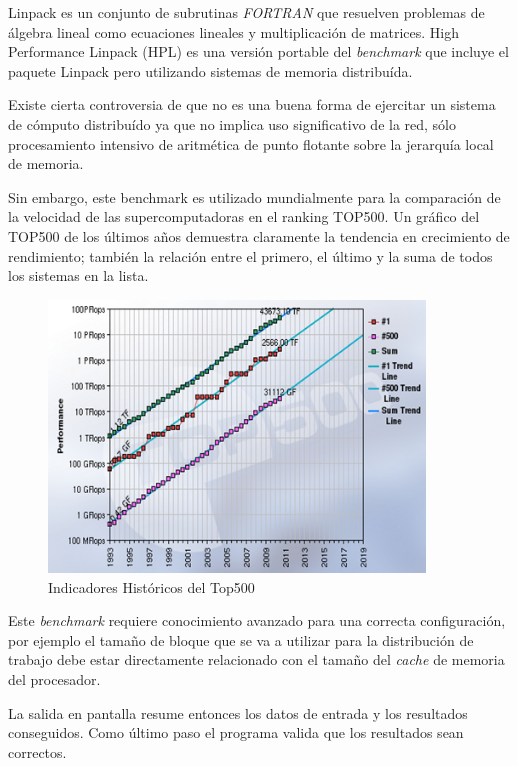 \documentclass[a4paper]{report}
\begin{document}
Linpack \cite{linpack} es un conjunto de subrutinas {\it FORTRAN} que resuelven
problemas de \'algebra lineal como ecuaciones lineales y multiplicaci\'on de
matrices. High Performance Linpack (HPL) \cite{hpl} es una versi\'on portable del {\it benchmark} que incluye
el paquete Linpack pero utilizando sistemas de memoria distribu\'ida.

\bigskip

Existe cierta controversia de que no es una buena forma de ejercitar un
sistema de c\'omputo distribu\'ido ya que no implica uso significativo de la
red, s\'olo procesamiento intensivo de aritm\'etica de punto flotante
sobre la jerarqu\'ia local de memoria.

\bigskip

Sin embargo, este benchmark es utilizado mundialmente para la comparaci\'on de la
velocidad de las supercomputadoras en el ranking TOP500. 
Un gr\'afico del TOP500 de los \'ultimos a\~nos demuestra claramente la
tendencia en crecimiento de rendimiento; tambi\'en la relaci\'on entre el primero, el último y la suma de todos los sistemas en la lista.

\begin{figure}[H]
\begin{center}
\includegraphics[width=10cm]{top500.png}
\caption{Indicadores Hist\'oricos del Top500}
\end{center}
\end{figure}

Este {\it benchmark} requiere conocimiento avanzado para una correcta configuraci\'on,
por ejemplo el tama\~no de bloque que se va a utilizar para la distribuci\'on de trabajo
debe estar directamente relacionado con el tama\~no del {\it cache} de memoria del procesador.

\bigskip

La salida en pantalla resume entonces los datos de entrada y los resultados conseguidos.
Como \'ultimo paso el programa valida que los resultados sean correctos.
\end{document}
